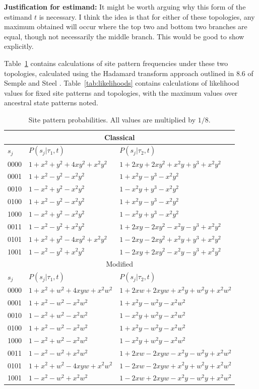 \documentclass[a4paper]{article}
\begin{document}
\textbf{Justification for estimand:} It might be worth arguing why this form of the estimand $t$ is necessary.
I think the idea is that for either of these topologies, any maximum obtained will occur where the top two and bottom two branches are equal, though not necessarily the middle branch.
This would be good to show explicitly.

Table~\ref{tab:sitepatprob} contains calculations of site pattern frequencies under these two topologies, calculated using the Hadamard transform approach outlined in 8.6 of Semple and Steel \cite{semplesteel}.
Table~\ref{tab:likelihoods} contains calculations of likelihood values for fixed site patterns and topologies, with the maximum values over ancestral state patterns noted.

\begin{table}
\centering
\begin{tabular}{|l|l|l|}
\multicolumn{3}{c}{Classical}\\
    \hline
$s_j$   &$P(s_j|\tau_1,t)$&$P(s_j|\tau_2,t)$\\
    \hline
0000&$1+x^2+y^2+4xy^2+x^2y^2$&$1+2xy+2xy^2+x^2y+y^3+x^2y^2$\\
0001&$1+x^2-y^2-x^2y^2$&$1+x^2y-y^3-x^2y^2$\\
0010&$1-x^2+y^2-x^2y^2$&$1-x^2y+y^3-x^2y^2$\\
0100&$1+x^2-y^2-x^2y^2$&$1+x^2y-y^3-x^2y^2$\\
1000&$1-x^2+y^2-x^2y^2$&$1-x^2y+y^3-x^2y^2$\\
0011&$1-x^2-y^2+x^2y^2$&$1+2xy-2xy^2-x^2y-y^3+x^2y^2$\\
0101&$1+x^2+y^2-4xy^2+x^2y^2$&$1-2xy-2xy^2+x^2y+y^3+x^2y^2$\\
1001&$1-x^2-y^2+x^2y^2$&$1-2xy+2xy^2-x^2y-y^3+x^2y^2$\\
    \hline
\multicolumn{3}{c}{Modified}\\
    \hline
$s_j$   &$P(s_j|\tau_1,t)$&$P(s_j|\tau_2,t)$\\
    \hline
0000&$1+x^2+w^2+4xyw+x^2w^2$&$1+2xw+2xyw+x^2y+w^2y+x^2w^2$\\
0001&$1+x^2-w^2-x^2w^2$&$1+x^2y-w^2y-x^2w^2$\\
0010&$1-x^2+w^2-x^2w^2$&$1-x^2y+w^2y-x^2w^2$\\
0100&$1+x^2-w^2-x^2w^2$&$1+x^2y-w^2y-x^2w^2$\\
1000&$1-x^2+w^2-x^2w^2$&$1-x^2y+w^2y-x^2w^2$\\
0011&$1-x^2-w^2+x^2w^2$&$1+2xw-2xyw-x^2y-w^2y+x^2w^2$\\
0101&$1+x^2+w^2-4xyw+x^2w^2$&$1-2xw-2xyw+x^2y+w^2y+x^2w^2$\\
1001&$1-x^2-w^2+x^2w^2$&$1-2xw+2xyw-x^2y-w^2y+x^2w^2$\\
    \hline
\end{tabular}    
\caption{Site pattern probabilities.
All values are multiplied by $1/8$.}
\label{tab:sitepatprob}
\end{table}
\end{document}
